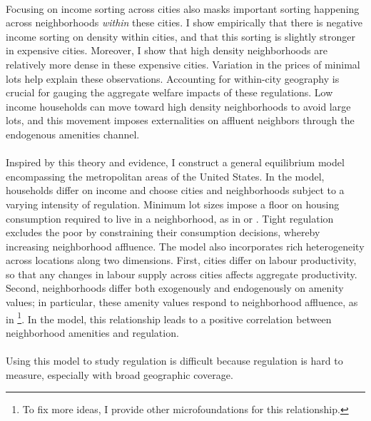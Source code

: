 \documentclass[]{article}
\begin{document}
	
	\paragraph*{} 
	Focusing on income sorting across cities also masks important sorting happening across neighborhoods \textit{within} these cities. I show empirically that there is negative income sorting on density within cities, and that this sorting is slightly stronger in expensive cities. Moreover, I show that high density neighborhoods are relatively more dense in these expensive cities. Variation in the prices of minimal lots help explain these observations. Accounting for within-city geography is crucial for gauging the aggregate welfare impacts of these regulations. Low income households can move toward high density neighborhoods to avoid large lots, and this movement imposes externalities on affluent neighbors through the endogenous amenities channel. 
	
	\paragraph*{}
	Inspired by this theory and evidence, I construct a general equilibrium model encompassing the metropolitan areas of the United States. In the model, households differ on income and choose cities and neighborhoods subject to a varying intensity of regulation. Minimum lot sizes impose a floor on housing consumption required to live in a neighborhood, as in \cite{kulka} or \cite{calabresetal}. Tight regulation excludes the poor by constraining their consumption decisions, whereby increasing neighborhood affluence. The model also incorporates rich heterogeneity across locations along two dimensions. First, cities differ on labour productivity, so that any changes in labour supply across cities affects aggregate productivity. Second, neighborhoods differ both exogenously and endogenously on amenity values; in  particular, these amenity values respond to neighborhood affluence, as in \citet*{parispoor}\footnote{To fix more ideas, I provide other microfoundations for this relationship.}. In the model, this relationship leads to a positive correlation between neighborhood amenities and regulation.

	\paragraph*{}
	Using this model to study regulation is difficult because regulation is hard to measure, especially with broad geographic coverage. 
\end{document}
